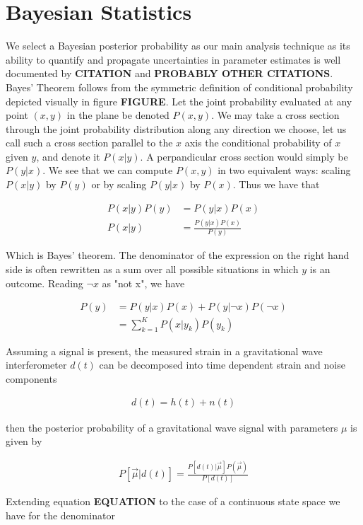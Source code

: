 \documentclass[paper=a4, fontsize=11pt]{scrartcl} %
\numberwithin{equation}{section} %
\numberwithin{figure}{section} %
\numberwithin{table}{section} %
\begin{document}
\section{Bayesian Statistics}
We select a Bayesian posterior probability as our main analysis technique as its ability to quantify and propagate uncertainties in parameter estimates is well documented by \textbf{CITATION} and \textbf{PROBABLY OTHER CITATIONS}. Bayes' Theorem follows from the symmetric definition of conditional probability depicted visually in figure \textbf{FIGURE}. Let the joint probability evaluated at any point $(x,y)$ in the plane be denoted $P(x,y)$. We may take a cross section through the joint probability distribution along any direction we choose, let us call such a cross section parallel to the $x$ axis the conditional probability of $x$ given $y$, and denote it $P(x|y)$. A perpandicular cross section would simply be $P(y|x)$. We see that we can compute $P(x,y)$ in two equivalent ways: scaling $P(x|y)$ by $P(y)$ or by scaling $P(y|x)$ by $P(x)$. Thus we have that 

\begin{align}
P(x|y)P(y) &= P(y|x)P(x) \\
P(x|y) &= \frac{P(y|x)P(x)}{P(y)}
\end{align}

Which is Bayes' theorem. The denominator of the expression on the right hand side is often rewritten as a sum over all possible situations in which $y$ is an outcome. Reading $\neg x$ as "not x", we have

\begin{align}
P(y) &= P(y|x)P(x) + P(y|\neg x)P(\neg x) \\
&= \sum_{k=1}^K P(x|y_k)P(y_k) 
\end{align}


 Assuming a signal is present, the measured strain in a gravitational wave interferometer $d(t)$ can be decomposed into time dependent strain and noise components

\begin{align}
d(t) = h(t) + n(t)
\end{align}  

then the posterior probability of a gravitational wave signal with parameters $\mu$ is given by 

\begin{align}
P[\vec{\mu}|d(t)] = \frac{P[d(t)|\vec{\mu}]P(\vec{\mu})}{P[d(t)]}
\end{align}

Extending equation \textbf{EQUATION} to the case of a continuous state space we have for the denominator
\end{document}
